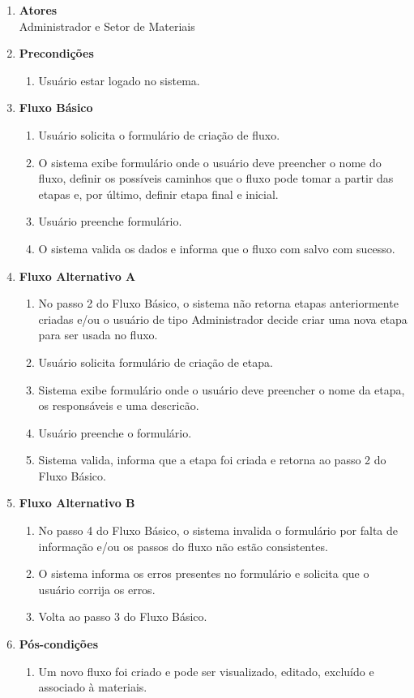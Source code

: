 \begin{enumerate}[label=\textbf{U02}, leftmargin=2cm]
	\begin{enumerate}[label=, leftmargin=0cm]
		\item \textbf{Atores} \\
		Administrador e Setor de Materiais
		\item \textbf{Precondições}
			\begin{enumerate}[label=\arabic*.]
				\item Usuário estar logado no sistema.
			\end{enumerate}
		\item \textbf{Fluxo Básico}
			\begin{enumerate}[label=\arabic*.]
				\item Usuário solicita o formulário de criação de fluxo.
				\item O sistema exibe formulário onde o usuário deve preencher o nome do fluxo, definir os possíveis caminhos que o fluxo pode tomar a partir das etapas e, por último, definir etapa final e inicial.
				\item Usuário preenche formulário.
				\item O sistema valida os dados e informa que o fluxo com salvo com sucesso.
			\end{enumerate}
		\item \textbf{Fluxo Alternativo A}
			\begin{enumerate}[label=\arabic*.]
				\item No passo 2 do Fluxo Básico, o sistema não retorna etapas anteriormente criadas e/ou o usuário de tipo Administrador decide criar uma nova etapa para ser usada no fluxo. 
				\item Usuário solicita formulário de criação de etapa.
				\item Sistema exibe formulário onde o usuário deve preencher o nome da etapa, os responsáveis e uma descricão.
				\item Usuário preenche o formulário.
				\item Sistema valida, informa que a etapa foi criada e retorna ao passo 2 do Fluxo Básico.
			\end{enumerate}
		\item \textbf{Fluxo Alternativo B}
			\begin{enumerate}[label=\arabic*.]
				\item No passo 4 do Fluxo Básico, o sistema invalida o formulário por falta de informação e/ou os passos do fluxo não estão consistentes.
				\item O sistema informa os erros presentes no formulário e solicita que o usuário corrija os erros.
				\item Volta ao passo 3 do Fluxo Básico.
			\end{enumerate}
		\item \textbf{Pós-condições}
			\begin{enumerate}[label=\arabic*.]
				\item Um novo fluxo foi criado e pode ser visualizado, editado, excluído e associado à materiais.
			\end{enumerate}
	\end{enumerate}
	 
\end{enumerate}

